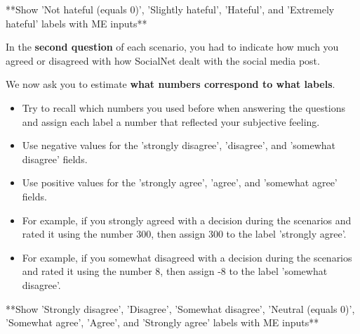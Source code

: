 \documentclass[a4paper]{article}
\begin{document}
**Show 'Not hateful (equals 0)', 'Slightly hateful', 'Hateful', and 'Extremely hateful' labels with ME inputs**

In the \textbf{second question} of each scenario, you had to indicate how much you agreed or disagreed with how SocialNet dealt with the social media post.

We now ask you to estimate \textbf{what numbers correspond to what labels}.

\begin{itemize}
    \item Try to recall which numbers you used before when answering the questions and assign each label a number that reflected your subjective feeling.
    \item Use negative values for the 'strongly disagree', 'disagree', and 'somewhat disagree' fields.
    \item Use positive values for the 'strongly agree', 'agree', and 'somewhat agree' fields.
    \item For example, if you strongly agreed with a decision during the scenarios and rated it using the number 300, then assign 300 to the label 'strongly agree'.
    \item For example, if you somewhat disagreed with a decision during the scenarios and rated it using the number 8, then assign -8 to the label 'somewhat disagree'.
\end{itemize}

**Show 'Strongly disagree', 'Disagree', 'Somewhat disagree', 'Neutral (equals 0)', 'Somewhat agree', 'Agree', and 'Strongly agree' labels with ME inputs**



\end{document}
